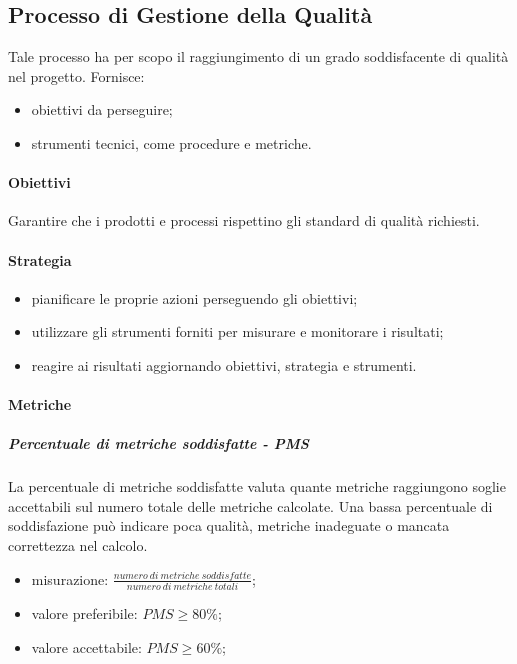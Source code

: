 	\subsection{Processo di Gestione della Qualità}
	Tale processo ha per scopo il raggiungimento di un grado soddisfacente di qualità nel progetto. Fornisce:
	\begin{itemize}
		\item obiettivi da perseguire;
		\item strumenti tecnici, come procedure e metriche.
	\end{itemize}
		\paragraph{Obiettivi}
		Garantire che i prodotti e processi rispettino gli standard di qualità richiesti.
		\paragraph{Strategia}
		\begin{itemize}
			\item pianificare le proprie azioni perseguendo gli obiettivi;
			\item utilizzare gli strumenti forniti per misurare e monitorare i risultati;
			\item reagire ai risultati aggiornando obiettivi, strategia e strumenti.
		\end{itemize}
		\paragraph{Metriche}
			\subparagraph{Percentuale di metriche soddisfatte - PMS}
			La percentuale di metriche soddisfatte valuta quante metriche raggiungono soglie accettabili sul numero totale delle metriche calcolate. Una bassa percentuale di soddisfazione può indicare poca qualità, metriche inadeguate o mancata correttezza nel calcolo.
			\begin{itemize}
				\item misurazione: $\frac{numero\ di\ metriche\ soddisfatte}{numero\ di\ metriche\ totali} $;
				\item valore preferibile: $PMS \geq 80\%$;
				\item valore accettabile: $PMS \geq 60\%$;
			\end{itemize}
	
